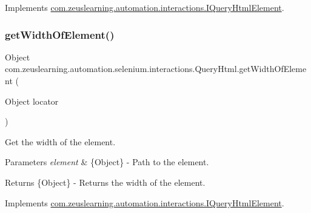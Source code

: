 Implements \hyperlink{interfacecom_1_1zeuslearning_1_1automation_1_1interactions_1_1IQueryHtmlElement_a78298d723dbd0b7bef6098971596b78f}{com.\+zeuslearning.\+automation.\+interactions.\+I\+Query\+Html\+Element}.

\hypertarget{classcom_1_1zeuslearning_1_1automation_1_1selenium_1_1interactions_1_1QueryHtml_a8e93f8a477d39f58357ab540e4ef78c1}{}\label{classcom_1_1zeuslearning_1_1automation_1_1selenium_1_1interactions_1_1QueryHtml_a8e93f8a477d39f58357ab540e4ef78c1} 
\subsubsection{\texorpdfstring{get\+Width\+Of\+Element()}{getWidthOfElement()}}
{\footnotesize\ttfamily Object com.\+zeuslearning.\+automation.\+selenium.\+interactions.\+Query\+Html.\+get\+Width\+Of\+Element (\begin{DoxyParamCaption}\item[{Object}]{locator }\end{DoxyParamCaption})\hspace{0.3cm}{\ttfamily [inline]}}

Get the width of the element.


\begin{DoxyParams}{Parameters}
{\em element} & \{Object\} -\/ Path to the element. \\
\hline
\end{DoxyParams}
\begin{DoxyReturn}{Returns}
\{Object\} -\/ Returns the width of the element. 
\end{DoxyReturn}


Implements \hyperlink{interfacecom_1_1zeuslearning_1_1automation_1_1interactions_1_1IQueryHtmlElement_a6edc78d4dfd12bb3e9bdbc67c9abdff3}{com.\+zeuslearning.\+automation.\+interactions.\+I\+Query\+Html\+Element}.

